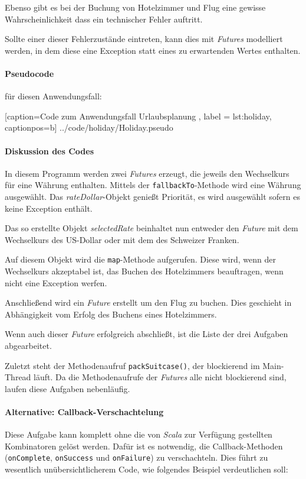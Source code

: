 Ebenso gibt es bei der Buchung von Hotelzimmer und Flug eine gewisse 
Wahrscheinlichkeit dass ein technischer Fehler auftritt.

Sollte einer dieser Fehlerzustände eintreten, kann dies mit \emph{Futures} 
modelliert werden, in dem diese eine Exception statt eines zu 
erwartenden Wertes enthalten.

\paragraph{Pseudocode} für diesen Anwendungsfall:


    [caption={Code zum Anwendungsfall \glqq Urlaubsplanung\grqq{} },
       label = lst:holiday,
       captionpos=b]
 {../code/holiday/Holiday.pseudo}
 
\paragraph{Diskussion des Codes}

In diesem Programm werden zwei \emph{Futures} erzeugt, die jeweils
den Wechselkurs für eine Währung enthalten. Mittels der
\texttt{fallbackTo}-Methode wird eine Währung ausgewählt.
Das \emph{rateDollar}-Objekt genießt Priorität, es wird ausgewählt
sofern es keine Exception enthält.

Das so erstellte Objekt \emph{selectedRate} beinhaltet nun entweder
den \emph{Future} mit dem Wechselkurs des US-Dollar oder mit dem des
Schweizer Franken.

Auf diesem Objekt wird die \texttt{map}-Methode aufgerufen. Diese wird,
wenn der Wechselkurs akzeptabel ist, das Buchen des Hotelzimmers beauftragen,
wenn nicht eine Exception werfen.

Anschließend wird ein \emph{Future} erstellt um den Flug zu buchen. Dies
geschieht in Abhängigkeit vom Erfolg des Buchens eines Hotelzimmers.

Wenn auch dieser \emph{Future} erfolgreich abschließt, ist die
Liste der drei Aufgaben abgearbeitet.

Zuletzt steht der Methodenaufruf \texttt{packSuitcase()}, der blockierend
im Main-Thread läuft. Da die Methodenaufrufe der \emph{Futures} alle
nicht blockierend sind, laufen diese Aufgaben nebenläufig.

\paragraph{Alternative: Callback-Verschachtelung} Diese Aufgabe kann
komplett ohne die von \emph{Scala} zur Verfügung gestellten
Kombinatoren gelöst werden. Dafür ist es notwendig, die Callback-Methoden
(\texttt{onComplete}, \texttt{onSuccess} und \texttt{onFailure}) zu
verschachteln. Dies führt zu wesentlich unübersichtlicherem Code,
wie folgendes Beispiel verdeutlichen soll:

